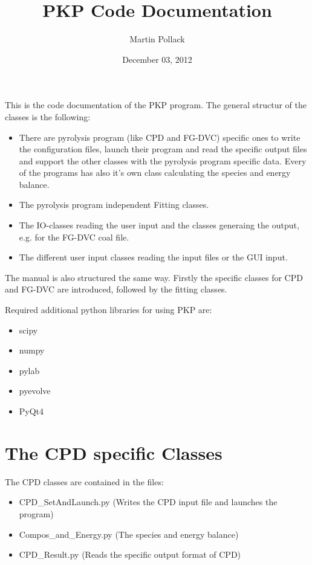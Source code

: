 \documentclass[letterpaper,10pt,english]{sphinxmanual}
\title{PKP Code Documentation}
\date{December 03, 2012}
\author{Martin Pollack}
\begin{document}
\maketitle
\tableofcontents
{}\label{index::doc}


This is the code documentation of the PKP program. The general structur of the classes is the following:
\begin{itemize}
\item {} 
There are pyrolysis program (like CPD and FG-DVC) specific ones to write the configuration files, launch their program and read the specific output files and support the other classes with the pyrolysis program specific data. Every of the programs has also it's own class calculating the species and energy balance.

\item {} 
The pyrolysis program independent Fitting classes.

\item {} 
The IO-classes reading the user input and the classes generaing the output, e.g. for the FG-DVC coal file.

\item {} 
The different user input classes reading the input files or the GUI input.

\end{itemize}

The manual is also structured the same way. Firstly the specific classes for CPD and FG-DVC are introduced, followed by the fitting classes.

Required additional python libraries for using PKP are:
\begin{itemize}
\item {} 
scipy

\item {} 
numpy

\item {} 
pylab

\item {} 
pyevolve

\item {} 
PyQt4

\end{itemize}


\chapter{The CPD specific Classes}
\label{CPDClasses::doc}\label{CPDClasses:the-pkp-code-documentation}\label{CPDClasses:the-cpd-specific-classes}
The CPD classes are contained in the files:
\begin{itemize}
\item {} 
CPD\_SetAndLaunch.py  (Writes the CPD input file and launches the program)

\item {} 
Compos\_and\_Energy.py  (The species and energy balance)

\item {} 
CPD\_Result.py (Reads the specific output format of CPD)

\end{itemize}
\label{CPDClasses:ss-readgen}
\end{document}

